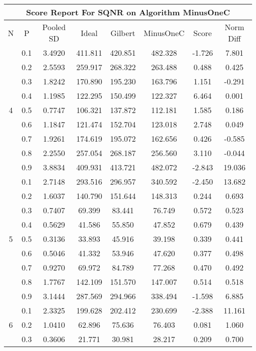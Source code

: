 \documentclass[11pt,a4paper]{report}
\begin{document}
\begin{longtable}{ | c | c || c | c | c | c | c | c | }
\hline
\multicolumn{8}{|c|}{ Score Report For SQNR on Algorithm MinusOneC} \\
\hline
N & P & Pooled SD &  Ideal &  Gilbert & MinusOneC  & Score & Norm Diff \\
 \hline
 \hline
 \endhead
\multirow{9}{*}{4} & 0.1 & 3.4920 & 411.811 & 420.851 & 482.328 & -1.726 & 7.801 \\
 & 0.2 & 2.5593 & 259.917 & 268.322 & 263.488 & 0.488 & 0.425 \\
 & 0.3 & 1.8242 & 170.890 & 195.230 & 163.796 & 1.151 & -0.291 \\
 & 0.4 & 1.1985 & 122.295 & 150.499 & 122.327 & 6.464 & 0.001 \\
 & 0.5 & 0.7747 & 106.321 & 137.872 & 112.181 & 1.585 & 0.186 \\
 & 0.6 & 1.1847 & 121.474 & 152.704 & 123.018 & 2.748 & 0.049 \\
 & 0.7 & 1.9261 & 174.619 & 195.072 & 162.656 & 0.426 & -0.585 \\
 & 0.8 & 2.2550 & 257.054 & 268.187 & 256.560 & 3.110 & -0.044 \\
 & 0.9 & 3.8834 & 409.931 & 413.721 & 482.072 & -2.843 & 19.036 \\
 \hline
\multirow{9}{*}{5} & 0.1 & 2.7148 & 293.516 & 296.957 & 340.592 & -2.450 & 13.682 \\
 & 0.2 & 1.6037 & 140.790 & 151.644 & 148.313 & 0.244 & 0.693 \\
 & 0.3 & 0.7407 & 69.399 & 83.441 & 76.749 & 0.572 & 0.523 \\
 & 0.4 & 0.5629 & 41.586 & 55.850 & 47.852 & 0.679 & 0.439 \\
 & 0.5 & 0.3136 & 33.893 & 45.916 & 39.198 & 0.339 & 0.441 \\
 & 0.6 & 0.5046 & 41.332 & 53.946 & 47.620 & 0.377 & 0.498 \\
 & 0.7 & 0.9270 & 69.972 & 84.789 & 77.268 & 0.470 & 0.492 \\
 & 0.8 & 1.7767 & 142.109 & 151.570 & 147.007 & 0.514 & 0.518 \\
 & 0.9 & 3.1444 & 287.569 & 294.966 & 338.494 & -1.598 & 6.885 \\
 \hline
\multirow{9}{*}{6} & 0.1 & 2.3325 & 199.628 & 202.412 & 230.699 & -2.388 & 11.161 \\
 & 0.2 & 1.0410 & 62.896 & 75.636 & 76.403 & 0.081 & 1.060 \\
 & 0.3 & 0.3606 & 21.771 & 30.981 & 28.217 & 0.209 & 0.700 \\

\end{longtable}
\end{document}
